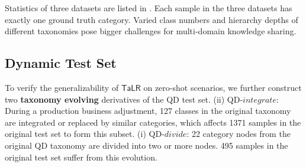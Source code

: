 
Statistics of 
three datasets are listed in . 
Each sample in the three datasets has exactly one ground truth category.
Varied class numbers and hierarchy depths of different taxonomies pose bigger challenges for multi-domain knowledge sharing.

\subsection{Dynamic Test Set}
To verify the generalizability of $\mathsf{TaLR}$ on zero-shot scenarios, we further construct two \textbf{taxonomy evolving} derivatives of the QD test set. 
(ii) QD-$integrate$: 
During a production business adjustment, 127 classes in the original taxonomy are integrated or replaced by similar categories, which affects 1371 samples in the original test set to form this subset. 
(i) QD-$divide$: 
22 category nodes from the original QD taxonomy are divided into two or more nodes.
495 samples in the original test set suffer from this evolution.

